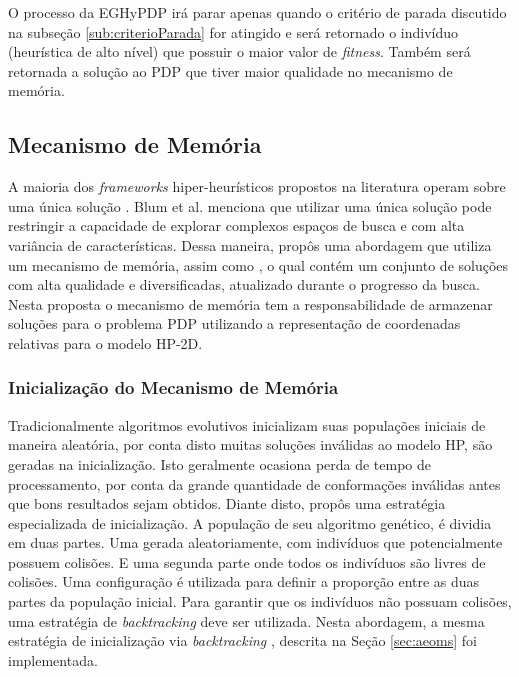 

O processo da EGHyPDP irá parar apenas quando o critério de parada discutido na subseção \ref{sub:criterioParada} for atingido e será retornado o indivíduo (heurística de alto nível) que possuir o maior valor de \textit{fitness}. Também será retornada a solução ao PDP que tiver maior qualidade no mecanismo de memória.



\subsection{Mecanismo de Memória}
\label{sub:MecanismoDeMemoria}

A maioria dos \textit{frameworks} hiper-heurísticos propostos na literatura operam sobre uma única solução \cite{chakhlevitch2008hyperheuristics, burke2013hyper}. Blum et al. \cite{blum2011hybrid} menciona que utilizar uma única solução pode restringir a capacidade de explorar complexos espaços de busca e com alta variância de características. Dessa maneira,  \cite{sabar2015automatic} propôs uma abordagem que utiliza um mecanismo de memória, assim como  \cite{talbi2006cosearch}, o qual contém um conjunto de soluções com alta qualidade e diversificadas, atualizado durante o progresso da busca. Nesta proposta o mecanismo de memória tem a responsabilidade de armazenar soluções para o problema PDP utilizando a representação de coordenadas relativas para o modelo HP-2D. 

\subsubsection{Inicialização do Mecanismo de Memória}

Tradicionalmente algoritmos evolutivos inicializam suas populações iniciais de maneira aleatória, por conta disto  muitas soluções inválidas ao modelo HP, são geradas na inicialização. Isto geralmente  ocasiona perda de tempo de processamento, por conta da grande quantidade de conformações inválidas antes que bons resultados sejam obtidos. Diante disto, \cite{benitez2015algoritmo} propôs uma estratégia especializada de inicialização. A população de seu algoritmo genético, é dividia em duas partes. Uma gerada aleatoriamente, com indivíduos que potencialmente possuem colisões. E uma segunda parte onde todos os indivíduos são livres de colisões. Uma configuração é utilizada para definir a proporção entre as duas partes da população inicial. Para garantir que os indivíduos não possuam colisões, uma estratégia de \textit{backtracking} deve ser utilizada. Nesta abordagem, a mesma estratégia de inicialização via \textit{backtracking }, descrita  na Seção \ref{sec:aeoms} foi implementada.





